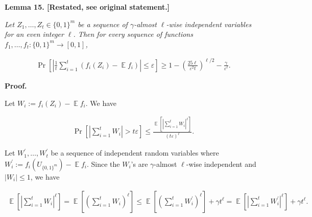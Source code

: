 




\par\medskip\noindent\textbf{
\textbf{Lemma 15}\textbf{.}
[Restated, see original statement.]}\par



\emph{Let $Z_{1},\dots,Z_{t}\in\{0,1\}^{m}$ be a sequence of $\gamma$-almost $\ell$-wise independent variables for an even integer $\ell$. Then for every sequence of functions $f_{1},\dots,f_{t}:\{0,1\}^{m}\to[0,1]$,}\par


\[\begin{gathered}
\Pr\left[\left|\frac{1}{t}\sum_{i=1}^{t}(f_{i}(Z_{i})-\operatorname*{\mathbb{E}}f_{i})\right|\leq\varepsilon\right]\geq 1-\left(\frac{25{\ell}}{\varepsilon^{2}{t}}\right)^{\ell/2}-\frac{\gamma}{\varepsilon^{\ell}}.
\end{gathered}\]







\par\medskip\noindent\textbf{Proof.}\par




Let $W_{i}:=f_{i}(Z_{i})-\operatorname*{\mathbb{E}}f_{i}$.
We have\par


\[\begin{gathered}
\displaystyle\Pr\left[\left|\sum_{i=1}^{t}W_{i}\right|>t\varepsilon\right]\leq\frac{\operatorname*{\mathbb{E}}\left[\left|\sum_{i=1}^{t}W_{i}\right|^{\ell}\right]}{(t\varepsilon)^{\ell}}.
\end{gathered}\]


Let $W_{1}^{\prime},\dots,W_{t}^{\prime}$ be a sequence of independent random variables where $W_{i}^{\prime}:=f_{i}(U_{\{0,1\}^{m}})-\operatorname*{\mathbb{E}}f_{i}$. Since the $W_{i}$’s are $\gamma$-almost $\ell$-wise independent and $|W_{i}|\leq 1$, we have\par


\[\begin{gathered}
\operatorname*{\mathbb{E}}\left[\left|\sum_{i=1}^{t}W_{i}\right|^{\ell}\right]=\operatorname*{\mathbb{E}}\left[\left(\sum_{i=1}^{t}W_{i}\right)^{\ell}\right]\leq\operatorname*{\mathbb{E}}\left[\left(\sum_{i=1}^{t}W_{i}^{\prime}\right)^{\ell}\right]+\gamma t^{\ell}=\operatorname*{\mathbb{E}}\left[\left|\sum_{i=1}^{t}W_{i}^{\prime}\right|^{\ell}\right]+\gamma t^{\ell}.
\end{gathered}\]


